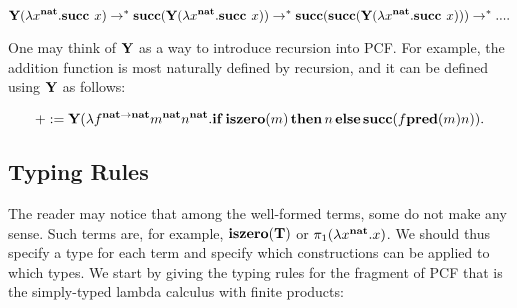 
$$\textbf{Y}(\lambda x^{\textbf{nat}}. \textbf{succ } x) \to^* \textbf{succ}(\textbf{Y}(\lambda x^{\textbf{nat}}. \textbf{succ } x)) \to^* \textbf{succ}(\textbf{succ}(\textbf{Y}(\lambda x^{\textbf{nat}}. \textbf{succ } x))) \to^* ... .$$

One may think of $\textbf{Y}$ as a way to introduce recursion into PCF. For example, the addition function is most naturally defined by recursion, and it can be defined using $\textbf{Y}$ as follows:

\[ + := \textbf{Y}(\lambda f^{\mathbf{nat}\to\mathbf{nat}}m^\mathbf{nat}n^\mathbf{nat}.\mathbf{if}\,\mathbf{iszero}(m)\,\mathbf{then}\,n\,\mathbf{else }\,\mathbf{succ}(f \mathbf{pred}(m) n)). \]

\subsection{Typing Rules}

The reader may notice that among the well-formed terms, some do not make any sense. Such terms are, for example, $\mathbf{iszero}(\mathbf{T})$ or $\pi_1(\lambda x^\mathbf{nat}.x)$. We should thus specify a type for each term and specify which constructions can be applied to which types. We start by giving the typing rules for the fragment of PCF that is the simply-typed lambda calculus with finite products:

